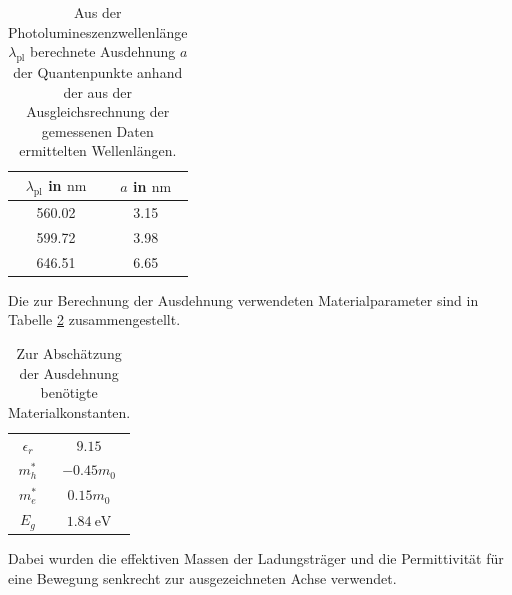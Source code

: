 \begin{table}[H]
  \centering
  \caption{Aus der Photolumineszenzwellenlänge $\lambda_{\text{pl}}$ berechnete Ausdehnung $a$ der Quantenpunkte anhand der aus der Ausgleichsrechnung der gemessenen Daten ermittelten Wellenlängen.}
  \label{tab:breiten2}
  \begin{tabular}{cc}
    \toprule
     $\lambda_{\text{pl}}$ in $\si{\nano\meter}$& $a$ in $\si{\nano\meter}$ \\
    \midrule
    560.02 & 3.15 \\
    599.72 & 3.98 \\
    646.51 & 6.65 \\
    \bottomrule
  \end{tabular}
\end{table}
Die zur Berechnung der Ausdehnung verwendeten Materialparameter sind in Tabelle \ref{tab:const} zusammengestellt.
\begin{table}[H]
  \centering
  \caption{Zur Abschätzung der Ausdehnung benötigte Materialkonstanten. \cite{dissArens}}
  \label{tab:const}
  \begin{tabular}{c|c}
    \toprule
    $\epsilon_r $ & $ 9.15$ \\
    $m^*_h$ & $ -0.45 m_0$ \\
    $m^*_e $ & $ 0.15 m_0$ \\
    $E_g $ & $\SI{1.84}{\electronvolt}$ \\
    \bottomrule
  \end{tabular}
\end{table}
Dabei wurden die effektiven Massen der Ladungsträger und die Permittivität für eine Bewegung senkrecht zur ausgezeichneten Achse verwendet.

\newpage
